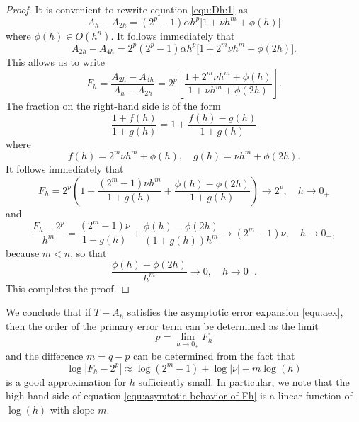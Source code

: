 \documentclass[runningheads]{llncs}
\begin{document}
\begin{proof} It is convenient to rewrite equation \eqref{equ:Dh:1} as
  \begin{equation}
    A_h - A_{2h} = (2^p-1) \alpha h^p \Big [ 1  + \nu h^m + \phi(h) \Big]
  \end{equation}
  where $\phi(h) \in O(h^n)$. It follows immediately that
   \begin{equation}
      A_{2h} - A_{4h} = 2^p (2^p-1) \alpha h^p \Big[ 1 + 2^m \nu h^m + \phi(2h) \Big].
  \end{equation}
  This allows us to write
  \begin{equation}
    F_h = \frac{ A_{2h} - A_{4h}}{ A_h - A_{2h}} = 2^p \left[ \frac{ 1 + 2^m \nu h^m + \phi(h)}{ 1  + \nu h^m + \phi(2h)} \right].
  \end{equation}
  The fraction on the right-hand side is of the form
  \begin{equation}
    \frac{1 + f(h)}{1 + g(h)} = 1 + \frac{f(h) - g(h)}{1 + g(h)}
  \end{equation}
  where
  \begin{equation}
    f(h) = 2^m \nu h^m + \phi(h), \quad g(h) = \nu h^m + \phi(2h).
  \end{equation}
  It follows immediately that
  \begin{equation}
    F_h = 2^p \left( 1 + \frac{(2^m-1)\nu h^m}{1+g(h)} + \frac{\phi(h) - \phi(2h)}{1+g(h)}\right) \rightarrow 2^p, \quad h \rightarrow 0_+
  \end{equation}
  and
  \begin{equation}
    \frac{F_h - 2^p}{h^m}  = \frac{(2^m-1)\nu }{1+g(h)} + \frac{\phi(h) - \phi(2h)}{(1+g(h))h^m} \rightarrow (2^m - 1) \nu, \quad h \rightarrow 0_+,
  \end{equation}
  because $m < n$, so that
  \begin{equation}
     \frac{\phi(h) - \phi(2h)}{h^m} \rightarrow 0, \quad h \rightarrow 0_+.
  \end{equation}
  This completes the proof.
\end{proof}
We conclude that if $T-A_h$ satisfies the asymptotic error expansion \eqref{equ:aex}, then the order of the primary error term can be determined as the limit
\begin{equation}
p = \underset{h \rightarrow 0_+}{\lim} F_h
\end{equation}
and the difference $m = q-p$ can be determined from the fact that
\begin{equation} \label{equ:asymtotic-behavior-of-Fh}
  \log |F_h - 2^p| \approx \log(2^m-1) + \log|\nu| + m \log(h)
\end{equation}
is a good approximation for $h$ sufficiently small. In particular, we note that the high-hand side of equation \ref{equ:asymtotic-behavior-of-Fh} is a linear function of $\log(h)$ with slope $m$.
\end{document}
